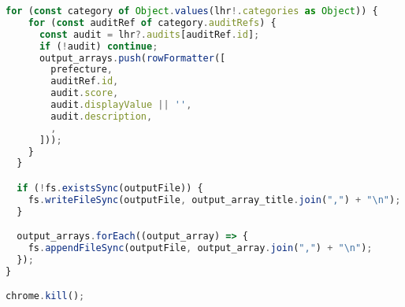 \begin{lstlisting}[language=JavaScript]
  for (const category of Object.values(lhr!.categories as Object)) {
    for (const auditRef of category.auditRefs) {
      const audit = lhr?.audits[auditRef.id];
      if (!audit) continue;
      output_arrays.push(rowFormatter([
        prefecture,
        auditRef.id,
        audit.score,
        audit.displayValue || '',
        audit.description,
        ,
      ]));
    }
  }

  if (!fs.existsSync(outputFile)) {
    fs.writeFileSync(outputFile, output_array_title.join(",") + "\n");
  }

  output_arrays.forEach((output_array) => {
    fs.appendFileSync(outputFile, output_array.join(",") + "\n");
  });
}

chrome.kill();
\end{lstlisting}